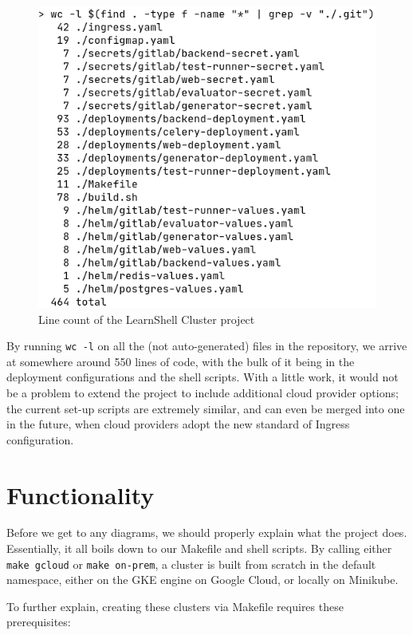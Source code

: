 \documentclass[thesis=B,english]{FITthesis}[2019/12/23]
\begin{document}
\begin{figure}[H]
\caption{Line count of the LearnShell Cluster project}
\includegraphics[scale=0.5]{line-count}
\end{figure}

By running \verb|wc -l| on all the (not auto-generated) files in the repository, we arrive at somewhere around 550 lines of code, with the bulk of it being in the deployment configurations and the shell scripts. With a little work, it would not be a problem to extend the project to include additional cloud provider options; the current set-up scripts are extremely similar, and can even be merged into one in the future, when cloud providers adopt the new standard of Ingress configuration.

\section{Functionality}

Before we get to any diagrams, we should properly explain what the project does. Essentially, it all boils down to our Makefile and shell scripts. By calling either \verb|make gcloud| or \verb|make on-prem|, a cluster is built from scratch in the default namespace, either on the GKE engine on Google Cloud, or locally on Minikube.

To further explain, creating these clusters via Makefile requires these prerequisites:
\end{document}
